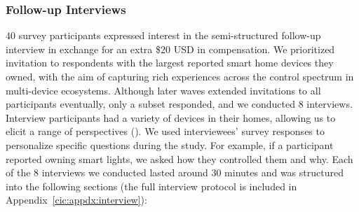 \subsubsection{Follow-up Interviews}
$40$ survey participants expressed interest in the semi-structured follow-up interview {in exchange for an extra \$20 USD in compensation}. {We prioritized invitation to respondents with the largest reported smart home devices they owned, with the aim of capturing rich experiences across the control spectrum in multi-device ecosystems. Although later waves extended invitations to all participants eventually, only a subset responded, and we conducted 8 interviews.} Interview participants had a variety of devices in their homes, allowing us to elicit a range of perspectives (). {We used interviewees' survey responses to personalize specific questions during the study. For example, if a participant reported owning smart lights, we asked how they controlled them and why.} Each of the 8 interviews we conducted lasted around 30 minutes and was structured into the following sections (the full interview protocol is included in Appendix~\ref{cic:appdx:interview}): 

